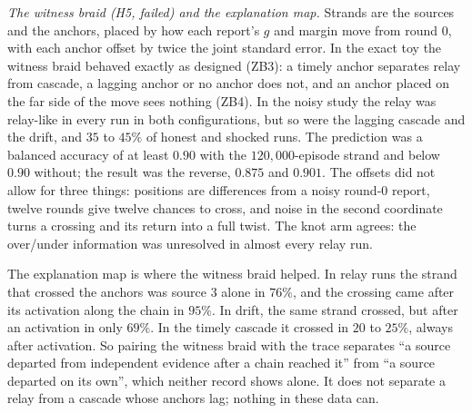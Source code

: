\documentclass[11pt]{article}
\theoremstyle{definition}\newtheorem{definition}[theorem]{Definition}\newtheorem{remark}[theorem]{Remark}\newtheorem{example}[theorem]{Example}\newtheorem{problem}[theorem]{Open problem}\crefname{problem}{Problem}{Problems}
\begin{document}
\emph{The witness braid (H5, failed) and the explanation map.} Strands are the sources and the anchors, placed by how each report's $g$ and margin move from round $0$, with each anchor offset by twice the joint standard error. In the exact toy the witness braid behaved exactly as designed (ZB3): a timely anchor separates relay from cascade, a lagging anchor or no anchor does not, and an anchor placed on the far side of the move sees nothing (ZB4). In the noisy study the relay was relay-like in every run in both configurations, but so were the lagging cascade and the drift, and $35$ to $45\%$ of honest and shocked runs. The prediction was a balanced accuracy of at least $0.90$ with the $120{,}000$-episode strand and below $0.90$ without; the result was the reverse, $0.875$ and $0.901$. The offsets did not allow for three things: positions are differences from a noisy round-$0$ report, twelve rounds give twelve chances to cross, and noise in the second coordinate turns a crossing and its return into a full twist. The knot arm agrees: the over/under information was unresolved in almost every relay run.

The explanation map is where the witness braid helped. In relay runs the strand that crossed the anchors was source $3$ alone in $76\%$, and the crossing came after its activation along the chain in $95\%$. In drift, the same strand crossed, but after an activation in only $69\%$. In the timely cascade it crossed in $20$ to $25\%$, always after activation. So pairing the witness braid with the trace separates ``a source departed from independent evidence after a chain reached it'' from ``a source departed on its own'', which neither record shows alone. It does not separate a relay from a cascade whose anchors lag; nothing in these data can.
\end{document}
